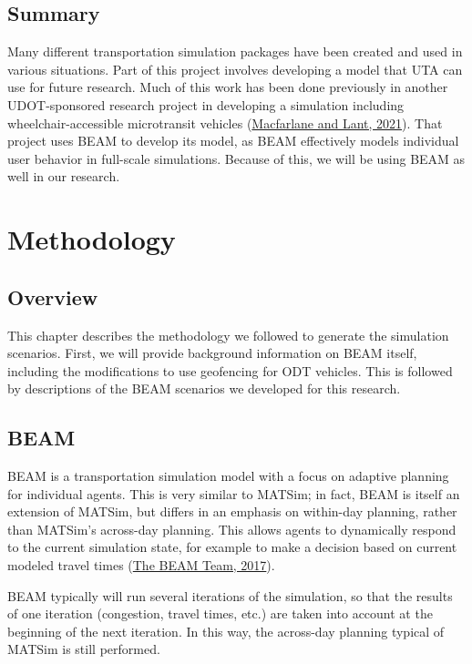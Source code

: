 \documentclass[
]{report}
\begin{document}
\hypertarget{summary}{%
\section{Summary}\label{summary}}

Many different transportation simulation packages have been created and used in various situations. Part of this project involves developing a model that UTA can use for future research. Much of this work has been done previously in another UDOT-sponsored research project in developing a simulation including wheelchair-accessible microtransit vehicles (\protect\hyperlink{ref-MacfarlaneLant}{Macfarlane and Lant, 2021}). That project uses BEAM to develop its model, as BEAM effectively models individual user behavior in full-scale simulations. Because of this, we will be using BEAM as well in our research.

\hypertarget{methodology}{%
\chapter{Methodology}\label{methodology}}

\hypertarget{overview-1}{%
\section{Overview}\label{overview-1}}

This chapter describes the methodology we followed to generate the simulation scenarios. First, we will provide background information on BEAM itself, including the modifications to use geofencing for ODT vehicles. This is followed by descriptions of the BEAM scenarios we developed for this research.

\hypertarget{beam}{%
\section{BEAM}\label{beam}}

BEAM is a transportation simulation model with a focus on adaptive planning for individual agents. This is very similar to MATSim; in fact, BEAM is itself an extension of MATSim, but differs in an emphasis on within-day planning, rather than MATSim's across-day planning. This allows agents to dynamically respond to the current simulation state, for example to make a decision based on current modeled travel times (\protect\hyperlink{ref-beamdocs}{The BEAM Team, 2017}).

BEAM typically will run several iterations of the simulation, so that the results of one iteration (congestion, travel times, etc.) are taken into account at the beginning of the next iteration. In this way, the across-day planning typical of MATSim is still performed.
\end{document}
